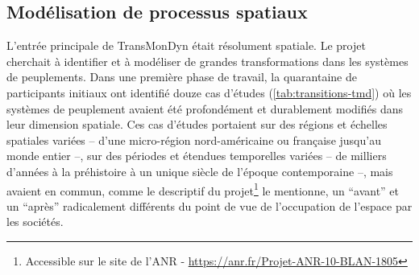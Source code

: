 \subsection{Modélisation de processus spatiaux}

L'entrée principale de TransMonDyn était résolument spatiale.
Le projet cherchait à identifier et à modéliser de grandes transformations dans les systèmes de peuplements.
Dans une première phase de travail, la quarantaine de participants initiaux ont identifié douze cas d'études (\cref{tab:transitions-tmd}) où les systèmes de peuplement avaient été profondément et durablement modifiés dans leur dimension spatiale.
Ces cas d'études portaient sur des régions et échelles spatiales variées -- d'une micro-région nord-américaine ou française jusqu'au monde entier --, sur des périodes et étendues temporelles variées -- de milliers d'années à la préhistoire à un unique siècle de l'époque contemporaine --, mais avaient en commun, comme le descriptif du projet\footnote{
	Accessible sur le site de l'ANR - \href{https://anr.fr/Projet-ANR-10-BLAN-1805}{https://anr.fr/Projet-ANR-10-BLAN-1805}
} le mentionne, \og un “avant” et un “après” radicalement différents du point de vue de l'occupation de l'espace par les sociétés\fg{}.

